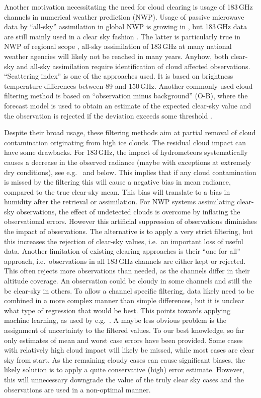 \documentclass[amt, manuscript]{copernicus}
\begin{document}
Another motivation necessitating the need for cloud clearing is usage of 183\,GHz channels in 
numerical weather prediction (NWP). Usage of passive microwave data by
``all-sky'' assimilation in global NWP is growing in \citep{geer2017growing},
but 183\,GHz data are still mainly used in a clear sky fashion
\citep{geer2018all}. The latter is particularly true in NWP of regional scope
\citep{gustafsson2018survey}, all-sky assimilation of 183\,GHz at many national
weather agencies will likely not be reached in many years. Anyhow, both clear-sky and all-sky assimilation require identification of cloud affected observations. ``Scattering index'' \cite{geer2015scatteringindex} is one of the approaches used. It is based on brightness temperature differences between 89 and 150\,GHz. Another commonly used cloud filtering method is based on ``observation minus background'' (O-B), where the forecast model is used to obtain an estimate of the expected clear-sky value and the observation is rejected if the deviation exceeds some threshold \citep{English1999clouddetection}. 

Despite their broad usage, these filtering methods aim at partial removal of cloud contamination originating from high ice clouds. The residual cloud impact can have some drawbacks. For 183\,GHz, the impact of hydrometeors systematically causes a decrease in the observed radiance (maybe with exceptions at extremely dry conditions), see
e.g.\ \citet{barlakas:three:20} and below. This implies that if any cloud contamination is missed by the filtering this will cause a negative bias in mean radiance, compared to the true clear-sky mean. This bias will translate to a bias in humidity after the retrieval or assimilation. For NWP systems assimilating clear-sky observations, the effect of undetected clouds is overcome by inflating the observational errors. However this artificial suppression of observations diminishes the impact of observations. The alternative is to apply a very strict filtering, but this increases the rejection of clear-sky values, i.e.\ an important loss of useful data. Another limitation of existing clearing approaches is their ``one for all'' approach, i.e.\ observations in all 183\,GHz channels are either kept or rejected. This often rejects more observations than needed, as the channels differ in their altitude coverage. An observation could be cloudy in some channels and still the be clear-sky in others. To allow a channel specific filtering, data likely need to be combined in a more complex manner than simple differences, but it is unclear what type of regression that would be best. This points towards applying machine learning, as used by e.g.\ \citet{favrichon2019detecting}. A maybe less obvious problem is the assignment of uncertainty to the filtered values. To our best knowledge, so far only estimates of mean and worst case errors have been provided. Some cases with relatively high cloud impact will likely be missed, while most cases are clear sky from start. As the remaining cloudy cases can cause significant biases, the likely solution is to apply a quite conservative (high) error estimate. However, this will unnecessary downgrade the value of the truly clear sky cases and the observations are used in a non-optimal manner.
\end{document}
